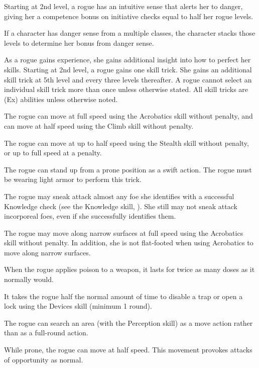  Starting at 2nd level, a rogue has an intuitive sense that alerts her to danger, giving her a competence bonus on initiative checks equal to half her rogue levels.
\par If a character has danger sense from a multiple classes, the character stacks those levels to determine her bonus from danger sense.

 As a rogue gains experience, she gains additional insight into how to perfect her skills. Starting at 2nd level, a rogue gains one skill trick. She gains an additional skill trick at 5th level and every three levels thereafter. A rogue cannot select an individual skill trick more than once unless otherwise stated. All skill tricks are (Ex) abilities unless otherwise noted.

 The rogue can move at full speed using the Acrobatics skill without penalty, and can move at half speed using the Climb skill without penalty.

 The rogue can move at up to half speed using the Stealth skill without penalty, or up to full speed at a  penalty.

 The rogue can stand up from a prone position as a swift action. The rogue must be wearing light armor to perform this trick.

 The rogue may sneak attack almost any foe she identifies with a successful Knowledge check (see the Knowledge skill, ). She still may not sneak attack incorporeal foes, even if she successfully identifies them.

 The rogue may move along narrow surfaces at full speed using the Acrobatics skill without penalty. In addition, she is not flat-footed when using Acrobatics to move along narrow surfaces.

 When the rogue applies poison to a weapon, it lasts for twice as many doses as it normally would.

 It takes the rogue half the normal amount of time to disable a trap or open a lock using the Devices skill (minimum 1 round).

 The rogue can search an area (with the Perception skill) as a move action rather than as a full-round action.

 While prone, the rogue can move at half speed. This movement provokes attacks of opportunity as normal.

